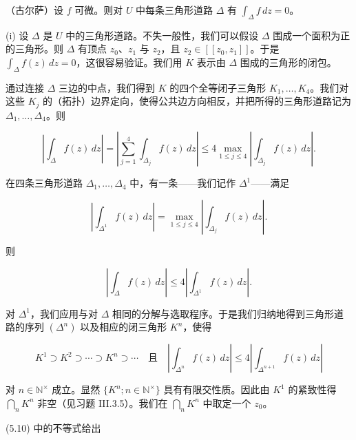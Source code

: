 \begin{theorem}

（古尔萨）设 $ f $ 可微。则对 $ U $ 中每条三角形道路 $ \Delta $ 有 $ \int_{\Delta} f\,dz = 0 $。

\proofhead
(i) 设 $ \Delta $ 是 $ U $ 中的三角形道路。不失一般性，我们可以假设 $ \Delta $ 围成一个面积为正的三角形。则 $ \Delta $ 有顶点 $ z_{0} $、$ z_{1} $ 与 $ z_{2} $，且 $ z_{2} \in [[z_{0},z_{1}]] $。于是 $ \int_{\Delta} f(z)\,dz = 0 $，这很容易验证。我们用 $ K $ 表示由 $ \Delta $ 围成的三角形的闭包。

通过连接 $ \Delta $ 三边的中点，我们得到 $ K $ 的四个全等闭子三角形 $ K_{1},\ldots,K_{4} $。我们对这些 $ K_{j} $ 的（拓扑）边界定向，使得公共边方向相反，并把所得的三角形道路记为 $ \Delta_{1},\ldots,\Delta_{4} $。则

\[
\left|\int_{\Delta} f(z)\,dz\right| = \left|\sum_{j=1}^{4}\int_{\Delta_{j}}f(z)\,dz\right| \le 4\max_{1\le j\le 4}\left|\int_{\Delta_{j}}f(z)\,dz\right| .
\]

在四条三角形道路 $ \Delta_{1},\ldots,\Delta_{4} $ 中，有一条——我们记作 $ \Delta^{1} $——满足

\[
\left|\int_{\Delta^{1}}f(z)\,dz\right| = \max_{1\le j\le 4}\left|\int_{\Delta_{j}}f(z)\,dz\right| .
\]

则

\[
\left|\int_{\Delta} f(z)\,dz\right| \le 4\left|\int_{\Delta^{1}}f(z)\,dz\right| .
\]

\begin{subitems}
\item[（ii）]

对 $ \Delta^{1} $，我们应用与对 $ \Delta $ 相同的分解与选取程序。于是我们归纳地得到三角形道路的序列 $ (\Delta^{n}) $ 以及相应的闭三角形 $ K^{n} $，使得

\begin{equation}
K^{1} \supset K^{2} \supset \cdots \supset K^{n} \supset \cdots \quad \text{且} \quad \left|\int_{\Delta^{n}}f(z)\,dz\right| \le 4\left|\int_{\Delta^{n+1}}f(z)\,dz\right|\tag{5.10}
\end{equation}

对 $ n \in \mathbb{N}^{\times} $ 成立。显然 $ \{K^{n} ; n \in \mathbb{N}^{\times}\} $ 具有有限交性质。因此由 $ K^{1} $ 的紧致性得 $ \bigcap_{n}K^{n} $ 非空（见习题 III.3.5）。我们在 $ \bigcap_{n}K^{n} $ 中取定一个 $ z_{0} $。

\item[（iii）]

(5.10) 中的不等式给出


\end{subitems}
\end{theorem}
